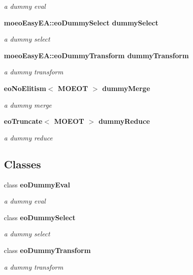 \begin{CompactItemize}
\begin{CompactList}\small\item\em a dummy eval \item\end{CompactList}\item 
\bf{moeo\-Easy\-EA::eo\-Dummy\-Select} \bf{dummy\-Select}\label{classmoeoEasyEA_fed6522fe0fcea204850dbb89cc7116e}

\begin{CompactList}\small\item\em a dummy select \item\end{CompactList}\item 
\bf{moeo\-Easy\-EA::eo\-Dummy\-Transform} \bf{dummy\-Transform}\label{classmoeoEasyEA_56991f36963ed61e44e91759c891f13c}

\begin{CompactList}\small\item\em a dummy transform \item\end{CompactList}\item 
\bf{eo\-No\-Elitism}$<$ MOEOT $>$ \bf{dummy\-Merge}\label{classmoeoEasyEA_e26830e1301cfd626eed55b0fbf8dbcb}

\begin{CompactList}\small\item\em a dummy merge \item\end{CompactList}\item 
\bf{eo\-Truncate}$<$ MOEOT $>$ \bf{dummy\-Reduce}\label{classmoeoEasyEA_65963f9308ccc0acc3dfc32a128f6228}

\begin{CompactList}\small\item\em a dummy reduce \item\end{CompactList}\end{CompactItemize}
\subsection*{Classes}
\begin{CompactItemize}
\item 
class \bf{eo\-Dummy\-Eval}
\begin{CompactList}\small\item\em a dummy eval \item\end{CompactList}\item 
class \bf{eo\-Dummy\-Select}
\begin{CompactList}\small\item\em a dummy select \item\end{CompactList}\item 
class \bf{eo\-Dummy\-Transform}
\begin{CompactList}\small\item\em a dummy transform \item\end{CompactList}\end{CompactItemize}


